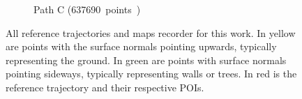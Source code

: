 \begin{figure}[htpb]
\begin{center}
\begin{subfigure}[b]{0.32\textwidth}
			\label{fig:ltr_c}
			\caption{Path C (\SI{637690} points)}
		\end{subfigure}%
		\caption{All reference trajectories and maps recorder for this work.
		In yellow are points with the surface normals pointing upwards, typically representing the ground.
		In green are points with surface normals pointing sideways, typically representing walls or trees.
		In red is the reference trajectory and their respective \acp{POI}.} 
		\label{fig:ref_ltr}
	\end{center}
\end{figure}


